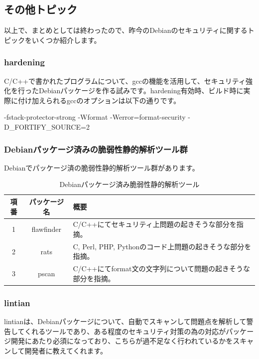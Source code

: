 \documentclass[mingoth,a4paper]{jsarticle}
\begin{document}
 \subsection{その他トピック}

 以上で、まとめとしては終わったので、昨今のDebianのセキュリティに関するトピックをいくつか紹介します。

 \subsubsection{hardening}

  C/C++で書かれたプログラムについて、gccの機能を活用して、セキュリティ強化を行ったDebianパッケージを作る試みです。hardening有効時、ビルド時に実際に付け加えられるgccのオプションは以下の通りです。
  
\begin{commandline}
-fstack-protector-strong -Wformat -Werror=format-security -D_FORTIFY_SOURCE=2
\end{commandline}

 \subsubsection{Debianパッケージ済みの脆弱性静的解析ツール群}

  Debianでパッケージ済の脆弱性静的解析ツール群があります。

\begin{table}
\begin{center}
\begin{tabular}{|c|c|p{5cm}|}
\hline
項番 & パッケージ名 & 概要 \\ \hline \hline
1 & flawfinder & C/C++にてセキュリティ上問題の起きそうな部分を指摘。 \\ \hline
2 & rats & C, Perl, PHP, Pythonのコード上問題の起きそうな部分を指摘。\\ \hline
3 & pscan & C/C++にてformat文の文字列について問題の起きそうな部分を指摘。 \\ \hline
\end{tabular}
\end{center}
\caption{Debianパッケージ済み脆弱性静的解析ツール}
\end{table}

\subsubsection{lintian}

 lintianは、Debianパッケージについて、自動でスキャンして問題点を解析して警告してくれるツールであり、ある程度のセキュリティ対策の為の対応がパッケージ開発にあたり必須になっており、こちらが過不足なく行われているかをスキャンして開発者に教えてくれます。
\end{document}
